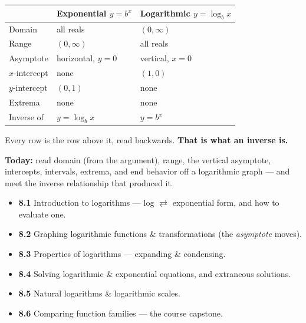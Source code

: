 \documentclass[aspectratio=169, 11pt]{beamer}
\begin{document}
\begin{frame}[t, plain]
  \begin{center}
  \renewcommand{\arraystretch}{1.35}
  \begin{tabular}{lll}
  \hline
   & \textbf{Exponential} $y=b^x$ & \textbf{Logarithmic} $y=\log_b x$ \\
  \hline
  Domain & all reals & $(0,\infty)$ \\
  Range & $(0,\infty)$ & all reals \\
  Asymptote & horizontal, $y=0$ & vertical, $x=0$ \\
  $x$-intercept & none & $(1,0)$ \\
  $y$-intercept & $(0,1)$ & none \\
  Extrema & none & none \\
  Inverse of & $y=\log_b x$ & $y=b^x$ \\
  \hline
  \end{tabular}
  \end{center}
  \vspace{4pt}
  \begin{center}
    Every row is the row above it, read backwards. \textbf{That is what an inverse is.}
  \end{center}
\end{frame}

\begin{frame}[t, plain]
  \textbf{Today:} read domain (from the argument), range, the vertical asymptote, intercepts,
  intervals, extrema, and end behavior off a logarithmic graph --- and meet the inverse relationship
  that produced it.\\[8pt]
  \begin{itemize}\setlength{\itemsep}{3pt}
    \item \textbf{8.1} Introduction to logarithms --- log $\rightleftarrows$ exponential form, and how to evaluate one.
    \item \textbf{8.2} Graphing logarithmic functions \& transformations (the \emph{asymptote} moves).
    \item \textbf{8.3} Properties of logarithms --- expanding \& condensing.
    \item \textbf{8.4} Solving logarithmic \& exponential equations, and extraneous solutions.
    \item \textbf{8.5} Natural logarithms \& logarithmic scales.
    \item \textbf{8.6} Comparing function families --- the course capstone.
  \end{itemize}
\end{frame}
\end{document}
